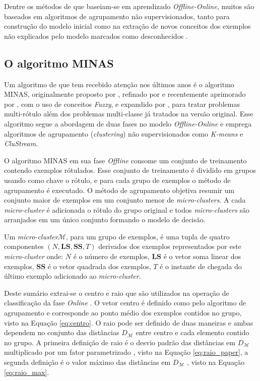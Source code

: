 Dentre os métodos de \nd que baseiam-se em aprendizado \emph{Offline-Online},
muitos são baseados em algoritmos de agrupamento não supervisionados, tanto
para construção do modelo inicial como na extração de novos conceitos dos
exemplos não explicados pelo modelo marcados como desconhecidos
\cite{Spinosa2009ollinda,Masud2010ECSMiner,Faria2013}.

\subsection{O algoritmo MINAS}\label{sec:minas-og}

Um algoritmo de \nd que tem recebido atenção nos últimos anos é o algoritmo
MINAS, originalmente proposto por , refinado por
 e recentemente aprimorado por
, com o uso de conceitos \emph{Fuzzy}, e expandido por
, para tratar problemas multi-rótulo além dos problemas
multi-classe já tratados na versão original.
Esse algoritmo segue a abordagem de duas fases no modelo \emph{Offline-Online} e
emprega algoritmos de agrupamento (\emph{clustering}) não supervisionados como
\emph{K-means} e \emph{CluStream}.

\newcommand{\mcluster}{\emph{micro-cluster}\xspace}
\newcommand{\mclusters}{\emph{micro-clusters}\xspace}

O algoritmo MINAS em sua fase \emph{Offline} consome um conjunto de treinamento
contendo exemplos rótulados.
Esse conjunto de treinamento é dividido em grupos usando como chave o rótulo,
e para cada grupo de exemplos o método de agrupamento é executado.
O método de agrupamento objetiva resumir um conjunto maior de exemplos em um
conjunto menor de \mclusters.
A cada \mcluster é adicionada o rótulo do grupo original e todos \mclusters
são arranjados em um único conjunto formando o modelo de decisão.

\begin{definition}
  Um \mcluster $\mathcal{M}$, para um grupo de exemplos, é uma tupla de quatro componentes
  $(N, \mathbf{LS}, \mathbf{SS}, T)$ derivados dos exemplos representados por
  este \mcluster onde:
  $N$ é o número de exemplos,
  $\mathbf{LS}$ é o vetor soma linear dos exemplos,
  $\mathbf{SS}$ é o vetor quadrada dos exemplos,
  $T$ é o instante de chegada do último exemplo adicionado ao \mcluster.
\end{definition}

Deste sumário extrai-se o centro e raio que são utilizados na operação de
classificação da fase \emph{Online} \cite{Faria2016minas}.
O vetor centro é definido como pelo algoritmo de agrupamento e corresponde ao
ponto médio dos exemplos contidos no grupo, visto na Equação \ref{eq:centro}.
O raio pode ser definido de duas maneiras e ambas dependem no conjunto das
distâncias $D_\mathcal{M}$ entre centro e cada elemento contido no grupo.
A primeira definição de raio é o desvio padrão das distâncias em $D_\mathcal{M}$
multiplicado por um fator parametrizado \cite{Faria2016minas}, visto na Equação
\ref{eq:raio_paper}, a segunda definição é o valor máximo das distâncias em
$D_\mathcal{M}$ \cite{Faria2013source}, visto na Equação \ref{eq:raio_max}.

